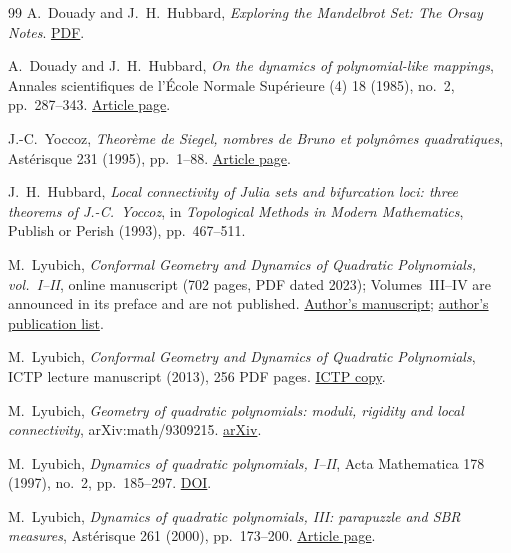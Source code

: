 \documentclass[11pt,a4paper,oneside,openany]{book}
\theoremstyle{definition}
\theoremstyle{remark}
\begin{document}
\backmatter
\renewcommand{\bibname}{References}
\begin{thebibliography}{99}\small
{}
A.~Douady and J.~H.~Hubbard,
\emph{Exploring the Mandelbrot Set: The Orsay Notes}.
\href{https://pi.math.cornell.edu/~hubbard/OrsayEnglish.pdf}{PDF}.

A.~Douady and J.~H.~Hubbard,
\emph{On the dynamics of polynomial-like mappings},
Annales scientifiques de l'École Normale Supérieure (4) 18
(1985), no.~2, pp.~287--343.
\href{https://www.numdam.org/item/ASENS_1985_4_18_2_287_0/}
{Article page}.

J.-C.~Yoccoz,
\emph{Theorème de Siegel, nombres de Bruno et polynômes quadratiques},
Astérisque 231 (1995), pp.~1--88.
\href{https://www.numdam.org/book-part/AST_1995__231__1_0/}{Article page}.

J.~H.~Hubbard,
\emph{Local connectivity of Julia sets and bifurcation loci:
three theorems of J.-C.~Yoccoz},
in \emph{Topological Methods in Modern Mathematics},
Publish or Perish (1993), pp.~467--511.

M.~Lyubich,
\emph{Conformal Geometry and Dynamics of Quadratic Polynomials,
vol.~I--II}, online manuscript (702 pages, PDF dated 2023); Volumes~III--IV are announced in its preface and are not published.
\href{https://www.math.stonybrook.edu/~mlyubich/book.pdf}{Author's manuscript};
\href{https://www.math.stonybrook.edu/~mlyubich/papers/index.html}
{author's publication list}.

M.~Lyubich,
\emph{Conformal Geometry and Dynamics of Quadratic Polynomials},
ICTP lecture manuscript (2013), 256 PDF pages.
\href{https://indico.ictp.it/event/a12182/session/2/contribution/1/material/0/0.pdf}
{ICTP copy}.

M.~Lyubich,
\emph{Geometry of quadratic polynomials: moduli, rigidity and local
connectivity}, arXiv:math/9309215.
\href{https://arxiv.org/abs/math/9309215}{arXiv}.

M.~Lyubich,
\emph{Dynamics of quadratic polynomials, I--II},
Acta Mathematica 178 (1997), no.~2, pp.~185--297.
\href{https://doi.org/10.1007/BF02392694}{DOI}.

M.~Lyubich,
\emph{Dynamics of quadratic polynomials, III: parapuzzle and SBR measures},
Astérisque 261 (2000), pp.~173--200.
\href{https://numdam.org/item/AST_2000__261__173_0/}{Article page}.


\end{thebibliography}
\end{document}
